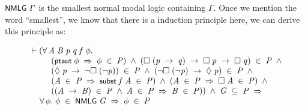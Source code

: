 \documentclass{report}
\renewcommand{\HOLConst}[1]{{\textsf{\upshape\small #1}}}
\renewcommand{\HOLinline}[1]{\ensuremath{#1}}
\newenvironment{holmath}{\begin{displaymath}\begin{array}{l}}{\end{array}\end{displaymath}\ignorespacesafterend}
\begin{document}
\HOLinline{\HOLConst{NMLG}\;\HOLFreeVar{\ensuremath{\Gamma}}} is the smallest normal modal logic containing $\Gamma$. Once we mention the word ``smallest'', we know that there is a induction principle here, we can derive this principle as:

\begin{holmath}
  \ensuremath{\HOLTokenTurnstile}(\HOLSymConst{\HOLTokenForall{}}\HOLBoundVar{A}\;\HOLBoundVar{B}\;\HOLBoundVar{p}\;\HOLBoundVar{q}\;\HOLBoundVar{f}\;\HOLBoundVar{\ensuremath{\phi}}.\\
\;\;\;\;\;\;\;\;\;\;(\HOLConst{ptaut}\;\HOLBoundVar{\ensuremath{\phi}}\;\HOLSymConst{\HOLTokenImp{}}\;\HOLBoundVar{\ensuremath{\phi}}\;\HOLSymConst{\HOLTokenIn{}}\;\HOLFreeVar{P})\;\HOLSymConst{\HOLTokenConj{}}\;(\HOLSymConst{\ensuremath{\Box}}\;(\HOLBoundVar{p}\;\HOLSymConst{\ensuremath{\rightarrow}}\;\HOLBoundVar{q})\;\HOLSymConst{\ensuremath{\rightarrow}}\;\HOLSymConst{\ensuremath{\Box}}\;\HOLBoundVar{p}\;\HOLSymConst{\ensuremath{\rightarrow}}\;\HOLSymConst{\ensuremath{\Box}}\;\HOLBoundVar{q})\;\HOLSymConst{\HOLTokenIn{}}\;\HOLFreeVar{P}\;\HOLSymConst{\HOLTokenConj{}}\\
\;\;\;\;\;\;\;\;\;\;(\HOLSymConst{\ensuremath{\Diamond}}\;\HOLBoundVar{p}\;\HOLSymConst{\ensuremath{\rightarrow}}\;\HOLSymConst{\HOLTokenNeg{}}\HOLSymConst{\ensuremath{\Box}}\;(\HOLSymConst{\HOLTokenNeg{}}\HOLBoundVar{p}))\;\HOLSymConst{\HOLTokenIn{}}\;\HOLFreeVar{P}\;\HOLSymConst{\HOLTokenConj{}}\;(\HOLSymConst{\HOLTokenNeg{}}\HOLSymConst{\ensuremath{\Box}}\;(\HOLSymConst{\HOLTokenNeg{}}\HOLBoundVar{p})\;\HOLSymConst{\ensuremath{\rightarrow}}\;\HOLSymConst{\ensuremath{\Diamond}}\;\HOLBoundVar{p})\;\HOLSymConst{\HOLTokenIn{}}\;\HOLFreeVar{P}\;\HOLSymConst{\HOLTokenConj{}}\\
\;\;\;\;\;\;\;\;\;\;(\HOLBoundVar{A}\;\HOLSymConst{\HOLTokenIn{}}\;\HOLFreeVar{P}\;\HOLSymConst{\HOLTokenImp{}}\;\HOLConst{subst}\;\HOLBoundVar{f}\;\HOLBoundVar{A}\;\HOLSymConst{\HOLTokenIn{}}\;\HOLFreeVar{P})\;\HOLSymConst{\HOLTokenConj{}}\;(\HOLBoundVar{A}\;\HOLSymConst{\HOLTokenIn{}}\;\HOLFreeVar{P}\;\HOLSymConst{\HOLTokenImp{}}\;\HOLSymConst{\ensuremath{\Box}}\;\HOLBoundVar{A}\;\HOLSymConst{\HOLTokenIn{}}\;\HOLFreeVar{P})\;\HOLSymConst{\HOLTokenConj{}}\\
\;\;\;\;\;\;\;\;\;\;((\HOLBoundVar{A}\;\HOLSymConst{\ensuremath{\rightarrow}}\;\HOLBoundVar{B})\;\HOLSymConst{\HOLTokenIn{}}\;\HOLFreeVar{P}\;\HOLSymConst{\HOLTokenConj{}}\;\HOLBoundVar{A}\;\HOLSymConst{\HOLTokenIn{}}\;\HOLFreeVar{P}\;\HOLSymConst{\HOLTokenImp{}}\;\HOLBoundVar{B}\;\HOLSymConst{\HOLTokenIn{}}\;\HOLFreeVar{P}))\;\HOLSymConst{\HOLTokenConj{}}\;\HOLFreeVar{G}\;\HOLSymConst{\HOLTokenSubset{}}\;\HOLFreeVar{P}\;\HOLSymConst{\HOLTokenImp{}}\\
\;\;\;\;\;\HOLSymConst{\HOLTokenForall{}}\HOLBoundVar{\ensuremath{\phi}}.\;\HOLBoundVar{\ensuremath{\phi}}\;\HOLSymConst{\HOLTokenIn{}}\;\HOLConst{NMLG}\;\HOLFreeVar{G}\;\HOLSymConst{\HOLTokenImp{}}\;\HOLBoundVar{\ensuremath{\phi}}\;\HOLSymConst{\HOLTokenIn{}}\;\HOLFreeVar{P}
\end{holmath}
\end{document}
